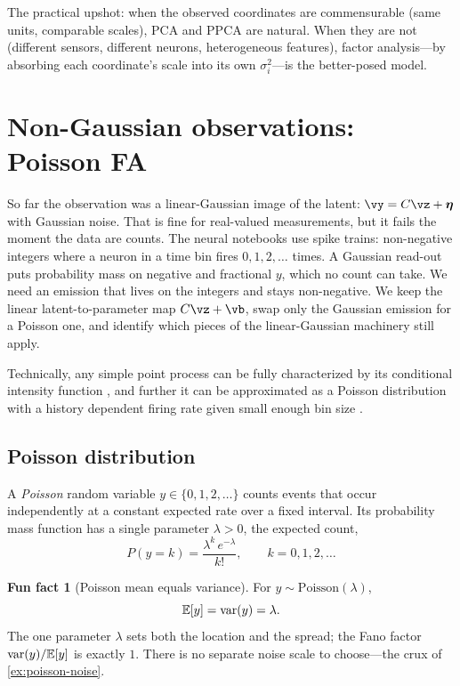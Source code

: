 \documentclass[11pt]{article}
\theoremstyle{plain}
\theoremstyle{definition}
\theoremstyle{remark}
\theoremstyle{definition}
\newtheorem{funfact}{Fun fact}
\newcommand{\E}{\mathbb{E}}
\newcommand{\veta}{\bm{\eta}}
\begin{document}
The practical upshot: when the observed coordinates are commensurable (same
units, comparable scales), PCA and PPCA are natural. When they are not (different
sensors, different neurons, heterogeneous features), factor analysis---by absorbing
each coordinate's scale into its own $\sigma_i^2$---is the better-posed model.

\section{Non-Gaussian observations: Poisson FA}\label{sec:expfam}

So far the observation was a linear-Gaussian image of the latent: $\vy = C\vz +
\veta$ with Gaussian noise. That is fine for real-valued measurements, but it
fails the moment the data are counts. The neural notebooks use spike trains:
non-negative integers where a neuron in a time bin fires $0,1,2,\dots$ times.
A Gaussian read-out puts probability mass on negative and
fractional $y$, which no count can take. We need an emission that lives on the
integers and stays non-negative.
We keep the linear latent-to-parameter map $C\vz + \vb$, swap only the Gaussian emission for a
Poisson one, and identify which pieces of the linear-Gaussian machinery still apply.

Technically, any simple point process can be fully characterized by its conditional
intensity function \parencite{Daley1988-te}, and further it can be approximated as a
Poisson distribution with a history dependent firing rate
given small enough bin size \parencite{Kass2014-st}.

\subsection{Poisson distribution}

A \emph{Poisson} random variable $y \in \{0, 1, 2, \dots\}$ counts events that
occur independently at a constant expected rate over a fixed interval. Its
probability mass function has a single parameter $\lambda > 0$, the expected count,
\begin{equation}\label{eq:poisson-pmf}
    P(y = k) = \frac{\lambda^k\, e^{-\lambda}}{k!}, \qquad k = 0, 1, 2, \dots
\end{equation}

\begin{funfact}[Poisson mean equals variance]\label{fact:poisson-moments}
For $y \sim \mathrm{Poisson}(\lambda)$,
\begin{equation}\label{eq:poisson-moments}
    \E[y] = \var(y) = \lambda .
\end{equation}
The one parameter $\lambda$ sets both the location and the spread; the Fano factor
$\var(y)/\E[y]$ is exactly $1$. There is no separate noise scale to choose---the
crux of \cref{ex:poisson-noise}.
\end{funfact}
\end{document}
